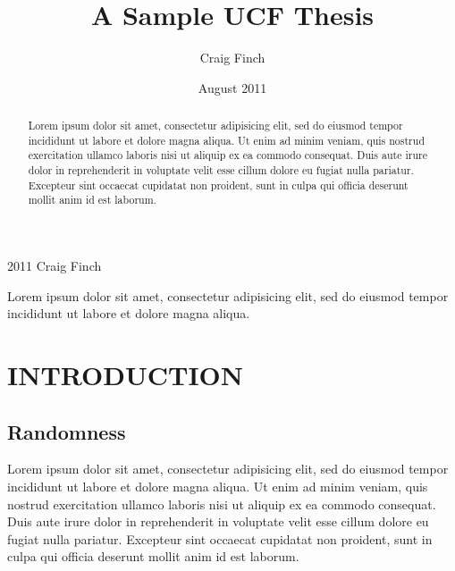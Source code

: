 \documentclass{UCFthesis}
\begin{document}

\title{A Sample UCF Thesis}
\author{Craig Finch}
\date{August 2011}
\maketitle
\thispagestyle{empty}

\begin{UCFcopyright}
2011 Craig Finch
\end{UCFcopyright}

\newpage
\begin{abstract}
Lorem ipsum dolor sit amet, consectetur adipisicing elit, sed do eiusmod tempor incididunt ut labore et dolore magna aliqua. Ut enim ad minim veniam, quis nostrud exercitation ullamco laboris nisi ut aliquip ex ea commodo consequat. Duis aute irure dolor in reprehenderit in voluptate velit esse cillum dolore eu fugiat nulla pariatur. Excepteur sint occaecat cupidatat non proident, sunt in culpa qui officia deserunt mollit anim id est laborum.
\end{abstract}

\begin{acknowledgements}
Lorem ipsum dolor sit amet, consectetur adipisicing elit, sed do eiusmod tempor incididunt ut labore et dolore magna aliqua.
\end{acknowledgements}

\clearpage
\tableofcontents

\newpage
{} \label{listoffigx}
\listoffigures

\newpage
{} \label{listoftabx}
\listoftables

\newpage
{}

\chapter{INTRODUCTION}

\section{Randomness}
Lorem ipsum dolor sit amet, consectetur adipisicing elit, sed do eiusmod tempor incididunt ut labore et dolore magna aliqua. Ut enim ad minim veniam, quis nostrud exercitation ullamco laboris nisi ut aliquip ex ea commodo consequat. Duis aute irure dolor in reprehenderit in voluptate velit esse cillum dolore eu fugiat nulla pariatur. Excepteur sint occaecat cupidatat non proident, sunt in culpa qui officia deserunt mollit anim id est laborum.
\end{document}
